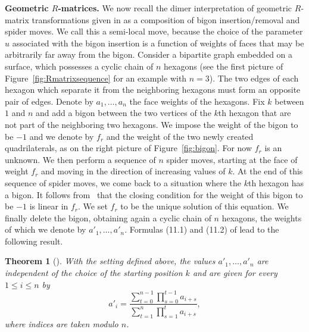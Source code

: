 \documentclass[10pt,a4paper]{amsart}
\numberwithin{equation}{section}
\newtheorem{Theorem}{Theorem}[section]
\def\boldsymbol#1{#1}
\begin{document}
	{\bf Geometric $\boldsymbol{R}$-matrices.}
	We now recall the dimer interpretation of geometric $R$-matrix transformations given in \cite[Section 11]{ILP1} as a composition of bigon insertion/removal and spider moves. We call this a semi-local move, because the choice of the parameter $u$ associated with the bigon insertion is a function of weights of faces that may be arbitrarily far away from the bigon. Consider a bipartite graph embedded on a surface, which possesses a cyclic chain of $n$ hexagons (see the first picture of Figure~\ref{fig:Rmatrixsequence} for an example with $n=3$). The two edges of each hexagon which separate it from the neighboring hexagons must form an opposite pair of edges. Denote by $a_1,\dots,a_n$ the face weights of the hexagons. Fix $k$ between $1$ and $n$ and add a bigon between the two vertices of the $k$th hexagon that are not part of the neighboring two hexagons. We impose the weight of the bigon to be $-1$ and we denote by $f_r$ and  the weight of the two newly created quadrilaterals, as on the right picture of Figure~\ref{fig:bigon}. For now $f_r$ is an unknown. We then perform a sequence of $n$ spider moves, starting at the face of weight $f_r$ and moving in the direction of increasing values of $k$. At the end of this sequence of spider moves, we come back to a situation where the $k$th hexagon has a bigon. It follows from~\cite{ILP1} that the closing condition for the weight of this bigon to be $-1$ is linear in $f_r$. We set $f_r$ to be the unique solution of this equation. We finally delete the bigon, obtaining again a cyclic chain of $n$ hexagons, the weights of which we denote by $a'_1,\dots,a'_n$. Formulas (11.1) and (11.2) of \cite{ILP1} lead to the following result.
	
	\begin{Theorem}[\cite{ILP1}]
		\label{thm:ILP}
		With the setting defined above, the values $a'_1,\dots,a'_n$ are independent of the choice of the starting position $k$ and are given for every $1\leq i \leq n$ by
		\begin{equation}
			\label{eq:Rmatrix}
			a'_i=\frac{\sum\limits_{t=0}^{n-1}\prod\limits_{s=0}^{t-1}a_{i+s}}{\sum\limits_{t=1}^{n}\prod\limits_{s=1}^{t}a_{i+s}},
		\end{equation}
		where indices are taken modulo $n$.
	\end{Theorem}
	
\end{document}

